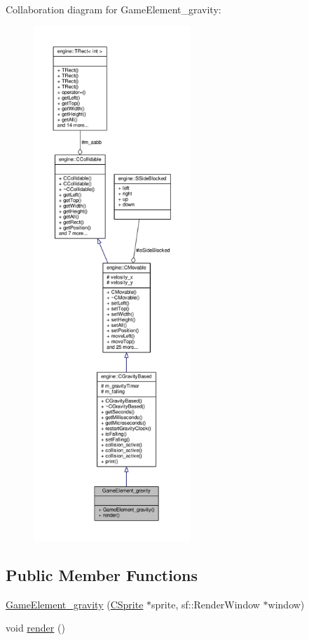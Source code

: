 Collaboration diagram for Game\-Element\-\_\-gravity\-:\nopagebreak
\begin{figure}[H]
\begin{center}
\leavevmode
\includegraphics[height=550pt]{classGameElement__gravity__coll__graph}
\end{center}
\end{figure}
\subsection*{Public Member Functions}
\begin{DoxyCompactItemize}
\item 
\hyperlink{classGameElement__gravity_abe7ee1a61b9250149bf93fb589e4fcfe}{Game\-Element\-\_\-gravity} (\hyperlink{classCSprite}{C\-Sprite} $\ast$sprite, sf\-::\-Render\-Window $\ast$window)
\item 
void \hyperlink{classGameElement__gravity_a78dcd87b6096dbd621a7707cdef26550}{render} ()
\end{DoxyCompactItemize}
